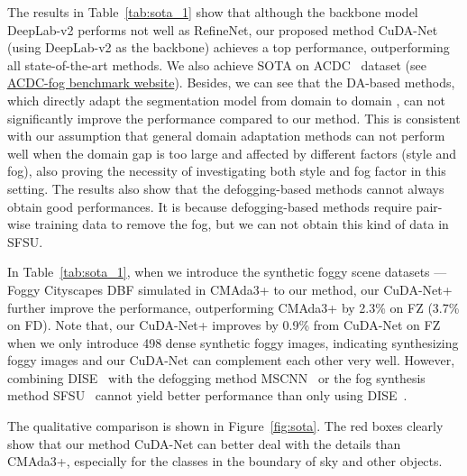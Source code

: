 \documentclass[10pt,twocolumn,letterpaper]{article}
\begin{document}
The results in Table~\ref{tab:sota_1} show that although the backbone model DeepLab-v2 performs not well as RefineNet, our proposed method CuDA-Net (using DeepLab-v2 as the backbone) achieves a top performance, outperforming all state-of-the-art methods. 
We also achieve SOTA on ACDC~\cite{ACDC} dataset (see \href{https://acdc.vision.ee.ethz.ch/benchmarks#semanticSegmentation}{ACDC-fog benchmark website}).
Besides, we can see that the DA-based methods, which directly adapt the segmentation model from domain  to domain , can not significantly improve the performance compared to our method. This is consistent with our assumption that general domain adaptation methods can not perform well when the domain gap is too large and affected by different factors (style and fog), also proving the necessity of investigating both style and fog factor in this setting.
The results also show that the defogging-based methods cannot always obtain good performances. It is because defogging-based methods require pair-wise training data to remove the fog, but we can not obtain this kind of data in SFSU.

In Table~\ref{tab:sota_1}, when we introduce the synthetic foggy scene datasets --- Foggy Cityscapes DBF simulated in CMAda3+ to our method, our CuDA-Net+ further improve the performance, outperforming CMAda3+ by 2.3\% on FZ (3.7\% on FD). 
Note that, our CuDA-Net+ improves by 0.9\% from CuDA-Net on FZ when we only introduce 498 dense synthetic foggy images, indicating synthesizing foggy images and our CuDA-Net can complement each other very well. 
However, combining DISE~\cite{chang2019all} with the defogging method MSCNN~\cite{ren2016single} or the fog synthesis method SFSU~\cite{sakaridis2018semantic} cannot yield better performance than only using DISE~\cite{chang2019all}.

The qualitative comparison is shown in Figure~\ref{fig:sota}. 
The red boxes clearly show that our method CuDA-Net can better deal with the details than CMAda3+, especially for the classes in the boundary of sky and other objects.
\end{document}
